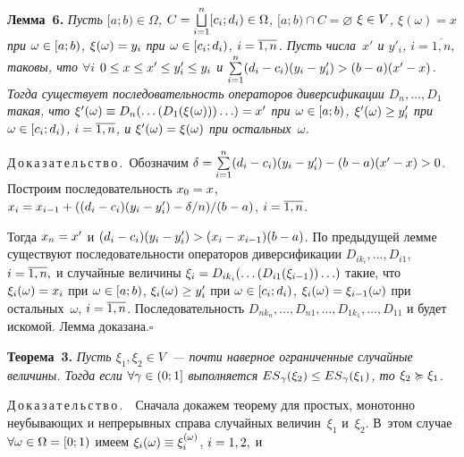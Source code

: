 \begin{multicols}{2}
\noindent
\textbf{Лемма~6.}
\textit{Пусть $[a;b)\in \Omega$, $C = \bigsqcup\limits_{i=1}^n
[c_i;d_i) \hm\in \Omega$, $[a;b) \cap C=\varnothing$
$\xi\hm\in V$, $\xi(\omega)=x$ при $\omega \hm\in [a;b)$,
$\xi(\omega)\hm=y_i$  при  $\omega \hm\in
[c_i;d_i)$, $i\hm=\overline{1,n}$. Пусть чис\-ла~$x'$ и
$y'_i$, $i=\overline{1,n},$ таковы, что $\forall i$ $0 \hm\le x \hm\le x'
\hm\le y_i' \hm\le y_i$ и $\sum\limits_{i=1}^n(d_i-c_i)(y_i-y_i') \hm>
(b-a)(x'-x)$. Тогда существует последовательность операторов
диверсификации $D_n,\ldots,D_1$ такая, что $\xi'(\omega) \hm\equiv
D_n(\ldots(D_1(\xi(\omega)))\ldots) \hm= x'$ при $\omega \hm\in [a;b)$,
$\xi'(\omega) \hm\ge y_i'$ при $\omega \hm\in
[c_i;d_i)$, $i\hm=\overline{1,n}$, и $\xi'(\omega) \hm= \xi(\omega)$ при
остальных~$\omega$.} 

\smallskip

\noindent
Д\,о\,к\,а\,з\,а\,т\,е\,л\,ь\,с\,т\,в\,о\,.\ 
Обозначим
$\delta\hm=\sum\limits_{i=1}^n(d_i\hm-c_i)(y_i-y_i')\hm-(b\hm-a)(x'\hm-x) \hm>0$.
Построим последовательность $x_0\hm=x$, $x_i\hm=x_{i-1} \hm+((d_i-c_i)(y_i-y_i')\hm-\delta / n)/
(b-a)$, $i\hm=\overline{1,n}$.

Тогда $x_n\hm=x'$ и $(d_i\hm-c_i)(y_i\hm-y_i') \hm> (x_i\hm-x_{i-1})(b\hm-a)$. По
предыдущей лемме существуют последовательности операторов
диверсификации $D_{ik_i},\ldots,D_{i1}$, $i\hm=\overline{1,n},$ и
случайные величины $\xi_i\hm=D_{ik_i}(\ldots(D_{i1}(\xi_{i-1}))\ldots)$
такие, что $\xi_i(\omega) \hm= x_i$ при $\omega \hm\in [a;b)$,
$\xi_i(\omega) \hm\ge y_i'$ при $\omega \hm\in [c_i;d_i)$,
$\xi_i(\omega) \hm= \xi_{i-1}(\omega)$ при остальных~$\omega$,
$i\hm=\overline{1,n}$. Последовательность
$D_{nk_n},\ldots,D_{n1},\ldots,D_{1k_1},\ldots,D_{11}$ и будет
искомой. Лемма доказана.\hfill$\square$

\medskip

\noindent
\textbf{Теорема~3.}
\textit{Пусть $\xi_1,\xi_2 \in V$~--- почти наверное
ограниченные случайные величины. Тогда если $\forall
\gamma \hm \in (0;1]$ выполняется ${ES}_\gamma(\xi_2) \hm\le
{ES}_\gamma(\xi_1)$, то $\xi_2 \succcurlyeq \xi_1$.}

\smallskip

\noindent
Д\,о\,к\,а\,з\,а\,т\,е\,л\,ь\,с\,т\,в\,о\,.\  ~Сначала
докажем теорему для простых, монотонно неубывающих и непрерывных
справа случайных величин~$\xi_1$ и~$\xi_2$. В~этом случае $\forall
\omega \hm\in \Omega\hm=[0;1)$ имеем
$\xi_i(\omega)\hm\equiv\xi_i^{(\omega)}$, $i\hm=1,2,$ и


\end{multicols}
